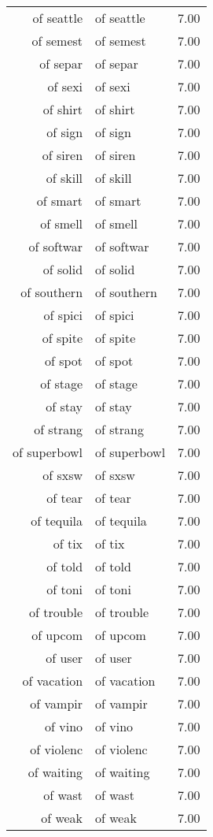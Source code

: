 \begin{table}[ht]
\begin{tabular}{rlr}
  of seattle & of seattle & 7.00 \\ 
  of semest & of semest & 7.00 \\ 
  of separ & of separ & 7.00 \\ 
  of sexi & of sexi & 7.00 \\ 
  of shirt & of shirt & 7.00 \\ 
  of sign & of sign & 7.00 \\ 
  of siren & of siren & 7.00 \\ 
  of skill & of skill & 7.00 \\ 
  of smart & of smart & 7.00 \\ 
  of smell & of smell & 7.00 \\ 
  of softwar & of softwar & 7.00 \\ 
  of solid & of solid & 7.00 \\ 
  of southern & of southern & 7.00 \\ 
  of spici & of spici & 7.00 \\ 
  of spite & of spite & 7.00 \\ 
  of spot & of spot & 7.00 \\ 
  of stage & of stage & 7.00 \\ 
  of stay & of stay & 7.00 \\ 
  of strang & of strang & 7.00 \\ 
  of superbowl & of superbowl & 7.00 \\ 
  of sxsw & of sxsw & 7.00 \\ 
  of tear & of tear & 7.00 \\ 
  of tequila & of tequila & 7.00 \\ 
  of tix & of tix & 7.00 \\ 
  of told & of told & 7.00 \\ 
  of toni & of toni & 7.00 \\ 
  of trouble & of trouble & 7.00 \\ 
  of upcom & of upcom & 7.00 \\ 
  of user & of user & 7.00 \\ 
  of vacation & of vacation & 7.00 \\ 
  of vampir & of vampir & 7.00 \\ 
  of vino & of vino & 7.00 \\ 
  of violenc & of violenc & 7.00 \\ 
  of waiting & of waiting & 7.00 \\ 
  of wast & of wast & 7.00 \\ 
  of weak & of weak & 7.00 \\ 

\end{tabular}
\end{table}
